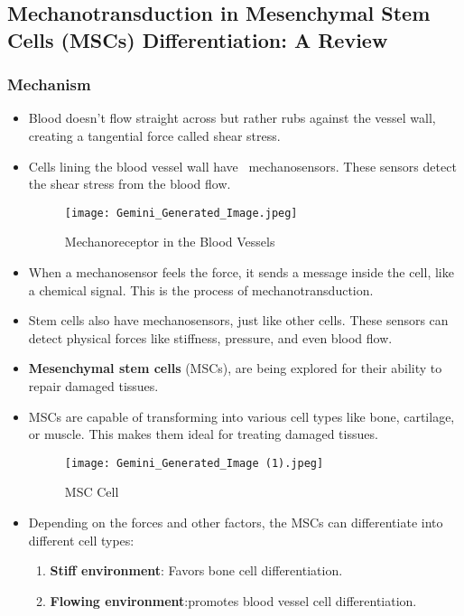 \documentclass{article}
\begin{document}
\subsection{Mechanotransduction in Mesenchymal Stem Cells (MSCs) Differentiation: A Review}
\subsubsection{Mechanism}
\begin{itemize}
    \item Blood doesn't flow straight across but rather rubs against the vessel wall, creating a tangential force called shear stress.
    \item Cells lining the blood vessel wall have \ mechanosensors. These sensors detect the shear stress from the blood flow. 
    
    \begin{figure}[h]
        \centering
        \texttt{[image: Gemini\_Generated\_Image.jpeg]}
        \caption{Mechanoreceptor in the Blood Vessels}
        \label{fig:enter-label}
    \end{figure}
    \item When a mechanosensor feels the force, it sends a message inside the cell, like a chemical signal. This is the process of mechanotransduction.
    \item Stem cells also have mechanosensors, just like other cells. These sensors can detect physical forces like stiffness, pressure, and even blood flow.

    \item  \textbf{Mesenchymal stem cells} (MSCs), are being explored for their ability to repair damaged tissues. 
    \newpage
    \item  MSCs are capable of transforming into various cell types like bone, cartilage, or muscle. This makes them ideal for treating damaged tissues.
    \begin{figure}[h]
        \centering
        \texttt{[image: Gemini\_Generated\_Image (1).jpeg]}
        \caption{MSC Cell}
        \label{fig:enter-label}
    \end{figure}
   \item  Depending on the forces and other factors, the MSCs can differentiate into different cell types:
\begin{enumerate}
\item \textbf{Stiff environment}: Favors bone cell differentiation.
\item \textbf{Flowing environment}:promotes blood vessel cell differentiation.


\end{enumerate}
\end{itemize}
\end{document}
